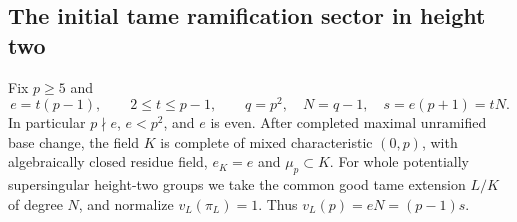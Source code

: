 \subsection{The initial tame ramification sector in height two}

Fix \(p\ge5\) and
\[
 e=t(p-1),\qquad 2\le t\le p-1,\qquad
 q=p^2,\quad N=q-1,\quad s=e(p+1)=tN .
 \tag{B-RD68.1}
\]
In particular \(p\nmid e\), \(e<p^2\), and \(e\) is even.
After completed maximal unramified base change, the field \(K\)
is complete of mixed characteristic \((0,p)\), with algebraically
closed residue field, \(e_K=e\) and \(\mu_p\subset K\).
For whole potentially supersingular height-two groups we take
the common good tame extension \(L/K\) of degree \(N\), and normalize
\(v_L(\pi_L)=1\). Thus \(v_L(p)=eN=(p-1)s\).


